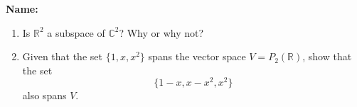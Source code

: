 \documentclass[12pt]{article}
\newcommand{\points}[1]{\marginpar{\hspace{24pt}[#1]}}
\newcommand{\R}{\mathbb{R}}
\newcommand{\C}{\mathbb{C}}
\begin{document}
\thispagestyle{fancy}
{\bf Name:}
 \begin{enumerate}
 \item  Is $\R^2$ a subspace of $\C^2$? Why or why not? \points{4}

\vspace{2.5in}

 \item Given that the set $\{1,x,x^2\}$ spans the vector space $V=P_2(\R)$, show that the set \points{6}
\[
 \{1-x,x-x^2,x^2\}
\]
also spans $V$.
 \end{enumerate}
\end{document}
